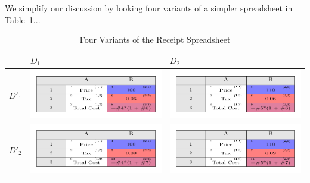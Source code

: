 \documentclass[conference]{IEEEtran}
\newcommand{\figscale}{0.6}
\begin{document}
We simplify our discussion by looking four variants of a simpler spreadsheet in Table~\ref{tbl:costcalc}...


\begin{table}
\centering
  \begin{tabular}{|>{\centering\arraybackslash}m{2em}|>{\centering\arraybackslash}m{25em} >{\centering\arraybackslash}m{25em}|}
    \hline
    & $D_1$ & $D_2$ \\ \hline
    $D'_1$ & \includegraphics[scale=\figscale]{tikz/costs1}
      & \includegraphics[scale=\figscale]{tikz/costs2} \\
      $D'_2$ & \includegraphics[scale=\figscale]{tikz/costs3} %
      & \includegraphics[scale=\figscale]{tikz/costs4} \\ \hline
  \end{tabular}
  \caption{Four Variants of the Receipt Spreadsheet}\label{tbl:costcalc}
\end{table}
\end{document}
